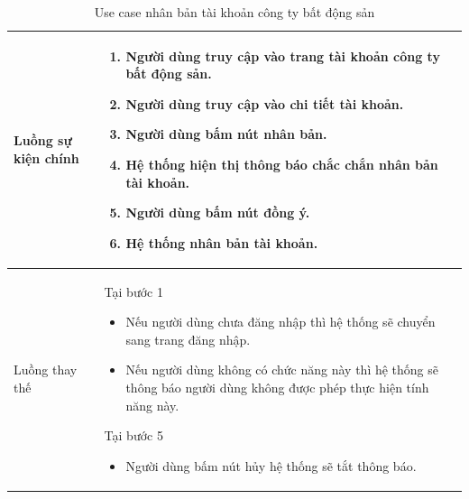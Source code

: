 \documentclass[12pt,a4paper]{article}
\begin{document}
\begin{table}[H]
\begin{tabular}{|p{3.5cm}|p{11.5cm}|c|}
            Luồng sự kiện chính & \vspace{-.8cm}\begin{enumerate}
                                                    \item Người dùng truy cập vào trang tài khoản công ty bất động sản.
                                                    \item Người dùng truy cập vào chi tiết tài khoản.
                                                    \item  Người dùng bấm nút nhân bản.
                                                    \item  Hệ thống hiện thị thông báo chắc chắn nhân bản tài khoản.
                                                    \item  Người dùng bấm nút đồng ý.
                                                    \item Hệ thống nhân bản tài khoản.
            \end{enumerate}
            \\
            \hline
            Luồng thay thế & Tại bước 1\newline
            \vspace{-.8cm}\begin{itemize}
                              \item Nếu người dùng chưa đăng nhập thì hệ thống sẽ chuyển sang trang đăng nhập.
                              \item Nếu người dùng không có chức năng này thì hệ thống sẽ thông báo người dùng không được phép thực hiện tính năng này.
            \end{itemize}

            Tại bước 5\newline
            \vspace{-.8cm}\begin{itemize}
                              \item Người dùng bấm nút hủy hệ thống sẽ tắt thông báo.
            \end{itemize} \\
            \hline
        \end{tabular}
        \caption{Use case nhân bản tài khoản công ty bất động sản }

    \end{table}


\end{document}
